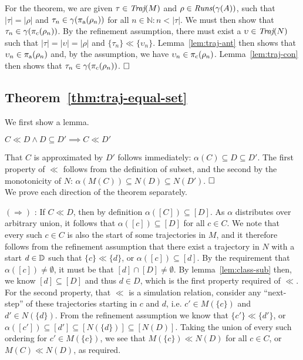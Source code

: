 For the theorem, we are given $\tau \in \operatorname{\textit{Traj}}(M)$ and $\rho \in \operatorname{\textit{Runs}}(\gamma(A))$, such that $| \tau | = | \rho |$ and $\tau_{n} \in \gamma(\operatorname{\pi_{\textrm{a}}}(\rho_{n}))$ for all $n \in \mathbb{N} : n < | \tau |$. We must then show that $\tau_{n} \in \gamma(\operatorname{\pi_{\textrm{c}}}(\rho_{n}))$. By the refinement assumption, there must exist a $\upsilon \in \operatorname{\textit{Traj}}(N)$ such that $| \tau | = | \upsilon | = | \rho |$ and $\{ \tau_{n} \} \ll \{ \upsilon_{n} \}$. Lemma~\ref{lem:traj-ant} then shows that $\upsilon_{n} \in \operatorname{\pi_{\textrm{a}}}(\rho_{n})$ and, by the assumption, we have $\upsilon_{n} \in \operatorname{\pi_{\textrm{c}}}(\rho_{n})$. Lemma~\ref{lem:traj-con} then shows that $\tau_{n} \in \gamma(\operatorname{\pi_{\textrm{c}}}(\rho_{n}))$. $\qedbox$

\subsection{Theorem~\ref{thm:traj-equal-set}}

We first show a lemma.

\begin{lemma} \label{lem:ll-sub}
$C \ll D \wedge D \subseteq D' \implies C \ll D'$
\end{lemma}

That $C$ is approximated by $D'$ follows immediately: $\alpha(C) \subseteq D \subseteq D'$. The first property of $\ll$ follows from the definition of subset, and the second by the monotonicity of $N$: $\alpha(M(C)) \subseteq N(D) \subseteq N(D')$. $\qedbox$
\\

We prove each direction of the theorem separately.

$(\Rightarrow)$ : If $C \ll D$, then by definition $\alpha([C]) \subseteq [D]$. As $\alpha$ distributes over arbitrary union, it follows that $\alpha([c]) \subseteq [D]$ for all $c \in C$. We note that every such $c \in C$ is also the start of some trajectories in $M$, and it therefore follows from the refinement assumption that there exist a trajectory in $N$ with a start $d \in \mathbb{D}$ such that $\{ c \} \ll \{ d \}$, or $\alpha([c]) \subseteq [d]$. By the requirement that $\alpha([c]) \neq \emptyset$, it must be that $[d] \cap [D] \neq \emptyset$. By lemma~\ref{lem:class-sub} then, we know $[d] \subseteq [D]$ and thus $d \in D$, which is the first property required of $\ll$. For the second property, that $\ll$ is a simulation relation, consider any ``next-step'' of these trajectories starting in $c$ and $d$, i.e. $c' \in M(\{ c \})$ and $d' \in N(\{ d \})$. From the refinement assumption we know that $\{ c' \} \ll \{ d' \}$, or $\alpha([c']) \subseteq [d'] \subseteq [N(\{ d \})] \subseteq [N(D)]$. Taking the union of every such ordering for $c' \in M(\{ c \})$, we see that $M(\{ c \}) \ll N(D)$ for all $c \in C$, or $M(C) \ll N(D)$, as required.


